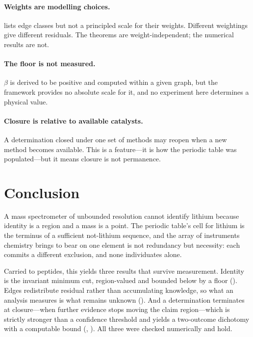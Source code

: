 \documentclass[11pt,a4paper]{article}
\theoremstyle{definition}
\theoremstyle{remark}
\newcommand{\flo}{\beta}                     %
\begin{document}
\paragraph{Weights are modelling choices.}  lists edge
classes but not a principled scale for their weights. Different weightings
give different residuals. The theorems are weight-independent; the
numerical results are not.

\paragraph{The floor is not measured.} $\flo$ is derived to be positive
and computed within a given graph, but the framework provides no
absolute scale for it, and no experiment here determines a physical
value.

\paragraph{Closure is relative to available catalysts.} A determination
closed under one set of methods may reopen when a new method becomes
available. This is a feature---it is how the periodic table was
populated---but it means closure is not permanence.

\section{Conclusion}
\label{sec:conclusion}

A mass spectrometer of unbounded resolution cannot identify lithium
because identity is a region and a mass is a point. The periodic table's
cell for lithium is the terminus of a sufficient not-lithium sequence,
and the array of instruments chemistry brings to bear on one element is
not redundancy but necessity: each commits a different exclusion, and
none individuates alone.

Carried to peptides, this yields three results that survive measurement.
Identity is the invariant minimum cut, region-valued and bounded below by
a floor (). Edges redistribute residual rather than
accumulating knowledge, so what an analysis measures is what remains
unknown (). And a determination terminates at
closure---when further evidence stops moving the claim region---which is
strictly stronger than a confidence threshold and yields a two-outcome
dichotomy with a computable bound (,
). All three were checked numerically and hold.
\end{document}
